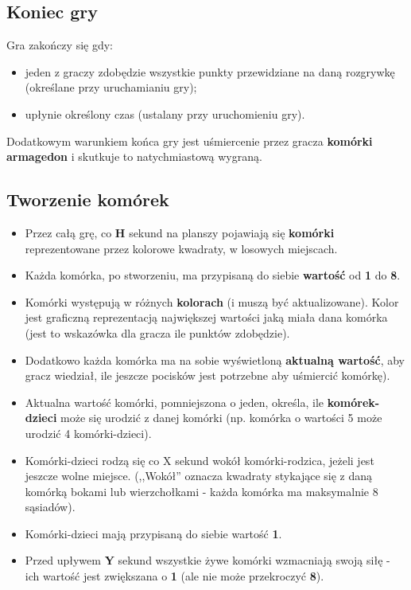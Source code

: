 \documentclass{article}
\begin{document}
\subsection{Koniec gry}
Gra zakończy się gdy:
\begin{itemize}
    \item jeden z graczy zdobędzie wszystkie punkty przewidziane na daną rozgrywkę (określane przy uruchamianiu gry); 
    \item upłynie określony czas (ustalany przy uruchomieniu gry). 
\end{itemize}
\par Dodatkowym warunkiem końca gry jest uśmiercenie przez gracza \textbf{komórki armagedon} i skutkuje to natychmiastową wygraną.

\subsection{Tworzenie komórek}
\begin{itemize}
    \item Przez całą grę, co \textbf{H} sekund na planszy pojawiają się \textbf{komórki} reprezentowane przez kolorowe kwadraty, w losowych miejscach. 
    
    \item Każda komórka, po stworzeniu, ma przypisaną do siebie \textbf{wartość} od \textbf{1} do \textbf{8}. 
    
    \item Komórki występują w różnych \textbf{kolorach} (i muszą być aktualizowane). Kolor jest graficzną reprezentacją największej wartości jaką miała dana komórka (jest to wskazówka dla gracza ile punktów zdobędzie).
    
    \item Dodatkowo każda komórka ma na sobie wyświetloną \textbf{aktualną wartość}, aby gracz wiedział, ile jeszcze pocisków jest potrzebne aby uśmiercić komórkę). 
    
    \item Aktualna wartość komórki, pomniejszona o jeden, określa, ile \textbf{komórek-dzieci} może się urodzić z danej komórki (np. komórka o wartości 5 może urodzić 4 komórki-dzieci). 
    
    \item Komórki-dzieci rodzą się co X sekund wokół komórki-rodzica, jeżeli jest jeszcze wolne miejsce. (,,Wokół'' oznacza kwadraty stykające się z daną komórką bokami lub wierzchołkami - każda komórka ma maksymalnie 8 sąsiadów).
    
    \item Komórki-dzieci mają przypisaną do siebie wartość \textbf{1}. 
    
    \item Przed upływem \textbf{Y} sekund wszystkie żywe komórki wzmacniają swoją siłę - ich wartość jest zwiększana o \textbf{1} (ale nie może przekroczyć \textbf{8}). 
 \end{itemize}  
    
\end{document}
